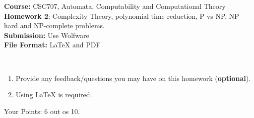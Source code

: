 \documentclass{article}%
\newcommand{\add}[1]{\textcolor{dkgreen}{#1}}
\begin{document}
\begin{flushleft}
\textbf{Course:} CSC707, Automata, Computability and Computational Theory\\
\textbf{Homework 2}: Complexity Theory, polynomial time reduction, P vs NP, NP-hard and NP-complete problems. \\
\textbf{Submission:} Use Wolfware\\
\textbf{File Format:} LaTeX and PDF\\
\end{flushleft}

\begin{center}
\\
\begin{enumerate}
	\item Provide any feedback/questions you may have on this homework (\textbf{optional}).
	\item Using LaTeX is required.
\end{enumerate}\end{center}

\noindent{\hrulefill}

\bigskip

\add{Your Points: 6 out os 10.}
\end{document}

